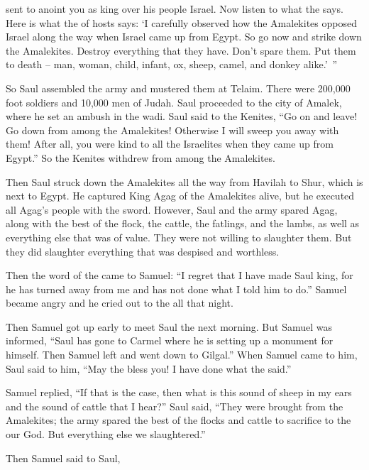 {{}
sent
to anoint
you as king
over
his people
Israel.
Now
listen
to what
the {}
says.
Here is what
the {}
of hosts
says: ‘I carefully
observed
how the Amalekites
opposed
Israel
along the way
when Israel came up
from Egypt.
So go
now
and strike down
the Amalekites.
Destroy
everything
that
they have. Don’t
spare
them. Put them to
death
– man,
woman,
child,
infant,
ox,
sheep,
camel,
and donkey alike.’ ”
\par }{\PP {}So Saul
assembled
the army
and mustered
them at Telaim.
There were 200,000
foot
soldiers and 10,000
men
of Judah.
Saul
proceeded
to the city
of Amalek,
where he set an ambush
in the wadi.
Saul
said
to
the Kenites,
“Go
on and leave! Go down
from among
the Amalekites! Otherwise
I will sweep
you away
with
them! After all, you
were kind
to
all
the Israelites
when they came up
from Egypt.”
So the Kenites
withdrew
from among
the Amalekites.
\par }{\PP {}Then Saul
struck down
the Amalekites
all the way from Havilah
to Shur,
which
is next to
Egypt.
He captured
King
Agag
of the Amalekites
alive,
but he executed all
Agag’s
people
with the sword.
However,
Saul
and the army
spared Agag,
along with the best
of the flock,
the cattle,
the fatlings,
and the lambs, as well as
everything
else that was of value. They were not
willing
to slaughter them.
But they did slaughter
everything
that was
despised
and worthless.
\par }{\PP {}Then
the word
of the {}
came to
Samuel:
“I regret
that
I have made
Saul
king,
for
he has turned
away
from me
and has not
done what
I told
him to do.” Samuel
became angry
and he cried
out to
the {}
all
that night.
\par }{\PP {}Then Samuel
got up early
to meet
Saul
the next morning.
But Samuel
was informed,
“Saul
has gone
to Carmel
where
he is setting up
a monument
for himself. Then Samuel left
and went down
to Gilgal.”
When Samuel
came
to
him, Saul
said
to him, “May the
{}
bless
you! I have done
what the
{}
said.”
\par }{\PP {}Samuel
replied,
“If that is the case, then what
is this
sound
of sheep
in my ears
and the sound
of cattle
that
I
hear?”
Saul
said,
“They were brought
from the Amalekites;
the army
spared
the best
of the flocks
and cattle
to sacrifice
to the
{}
our God.
But everything else we slaughtered.”
\par }{\PP {}Then Samuel
said
to
Saul,
}
